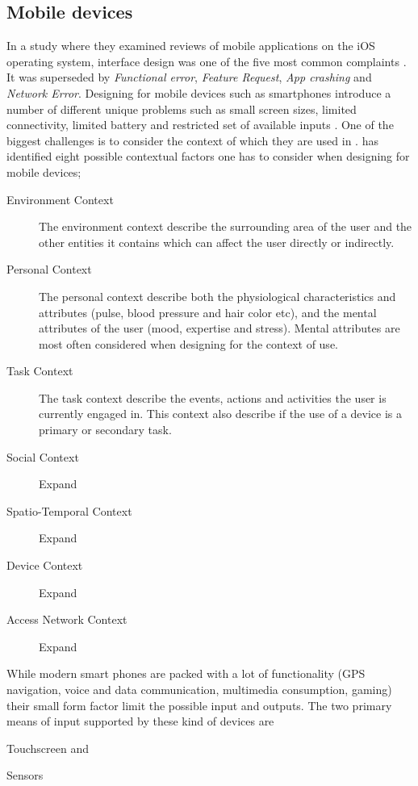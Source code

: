 {\subsection{Mobile devices}
In a study where they examined reviews of mobile applications on the iOS operating system, interface design was one of the five most common complaints \cite{Khalid2015}. It was superseded by \textit{Functional error}, \textit{Feature Request}, \textit{App crashing} and \textit{Network Error}.
Designing for mobile devices such as smartphones introduce a number of different unique problems such as small screen sizes, limited connectivity, limited battery and restricted set of available inputs \cite{Zhang2005}. One of the biggest challenges is to consider the context of which they are used in \cite{Zhang2005} \cite{Harrison2013} \cite{Korhonen2010}. \cite{Korhonen2010} has identified eight possible contextual factors one has to consider when designing for mobile devices;
\begin{description}
  \item [Environment Context] The environment context describe the surrounding area of the user and the other entities it contains which can affect the user directly or indirectly.
  \item [Personal Context] The personal context describe both the physiological characteristics and attributes (pulse, blood pressure and hair color etc), and the mental attributes of the user (mood, expertise and stress). Mental attributes are most often considered when designing for the context of use.
  \item[Task Context] The task context describe the events, actions and activities the user is currently engaged in. This context also describe if the use of a device is a primary or secondary task.
  \item[Social Context] Expand
  \item[Spatio-Temporal Context] Expand
  \item[Device Context] Expand
  \item[Access Network Context] Expand
\end{description}
While modern smart phones are packed with a lot of functionality (GPS navigation, voice and data communication, multimedia consumption, gaming) their small form factor limit the possible input and outputs. The two primary means of input supported by these kind of devices are
\begin{enumerate*}
  \item Touchscreen and
  \item Sensors
\end{enumerate*}

}

